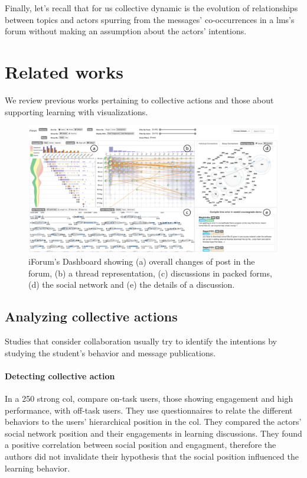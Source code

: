 \documentclass[a4paper,twoside]{article}
\begin{document}

Finally, let's recall that for us collective dynamic is the evolution of relationships between topics and actors spurring from the messages' co-occurrences in a \gls{lms}'s forum without making an assumption about the actors' intentions.

\section{Related works}
\label{section:3}
We review previous works pertaining to collective actions and those about supporting learning with visualizations.


\begin{figure}[b]
 \small{
  \caption{\label{fig:fu}
   iForum's Dashboard \citep{Fu2017} showing (a) overall changes of post in the forum, (b) a thread representation, (c) discussions in packed forms, (d) the social network and (e) the details of a discussion.
  }}
 \centering
 \includegraphics[width=.5\textwidth]{images/fu.png}
\end{figure}


\subsection{Analyzing collective actions}
Studies that consider collaboration usually try to identify the intentions by studying the student's behavior and message publications.


\paragraph{Detecting collective action} In a 250 strong \gls{col}, \cite{Rehm2015} compare on-task users, those showing engagement and high performance, with off-task users.  They use questionnaires to relate the different behaviors to the users' hierarchical position in the \gls{col}.  They compared the actors' social network position and their engagements in learning discussions.  They found a positive correlation between social position and engagment, therefore the authors did not invalidate their hypothesis that the social position influenced the learning behavior.  %
\end{document}
